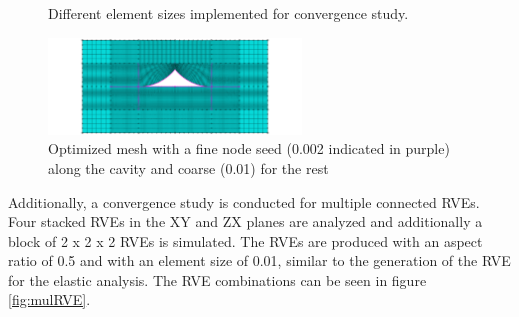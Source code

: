 \begin{figure}
  \caption{Different element sizes implemented for convergence study.}
  \label{fig:meshes}
\end{figure}
\begin{figure}[H]
    \centering
    \includegraphics[width=0.60\textwidth]{chapter_7_non-elasticmodelling/figures/meshopt.png}
    \caption{Optimized mesh with a fine node seed (0.002 indicated in purple) along the cavity and coarse (0.01) for the rest}
    \label{fig:meshopt}
\end{figure}

Additionally, a convergence study is conducted for multiple connected RVEs. Four stacked RVEs in the XY and ZX planes are analyzed and additionally a block of 2 x 2 x 2 RVEs is simulated. The RVEs are produced with an aspect ratio of 0.5 and with an element size of 0.01, similar to the generation of the RVE for the elastic analysis. The RVE combinations can be seen in figure \ref{fig:mulRVE}.

